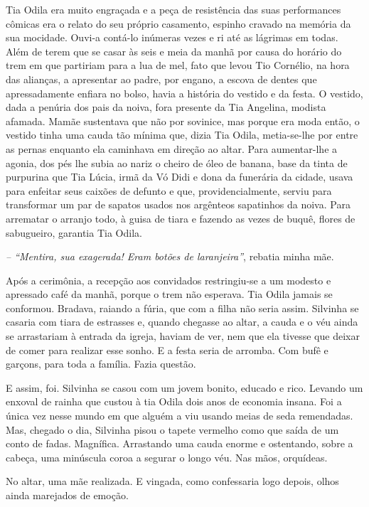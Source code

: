 Tia Odila era muito engraçada e a peça de resistência das suas performances cômicas era o relato do seu próprio casamento, espinho cravado na memória da sua mocidade.
Ouvi-a contá-lo inúmeras vezes e ri até as lágrimas em todas.
Além de terem que se casar às seis e meia da manhã por causa do horário do trem em que partiriam para a lua de mel, fato que levou Tio Cornélio, na hora das alianças, a apresentar ao padre, por engano, a escova de dentes que apressadamente enfiara no bolso, havia a história do vestido e da festa.
O vestido, dada a penúria dos pais da noiva, fora presente da Tia Angelina, modista afamada.
Mamãe sustentava que não por sovinice, mas porque era moda então, o vestido tinha uma cauda tão mínima que, dizia Tia Odila, metia-se-lhe por entre as pernas enquanto ela caminhava em direção ao altar.
Para aumentar-lhe a agonia, dos pés lhe subia ao nariz o cheiro de óleo de banana, base da tinta de purpurina que Tia Lúcia, irmã da Vó Didi e dona da funerária da cidade, usava para enfeitar seus caixões de defunto e que, providencialmente, serviu para transformar um par de sapatos usados nos argênteos sapatinhos da noiva.
Para arrematar o arranjo todo, à guisa de tiara e fazendo as vezes de buquê, flores de sabugueiro, garantia Tia Odila.

{\itshape -- ``Mentira, sua exagerada! Eram botões de laranjeira''}, rebatia minha mãe.

Após a cerimônia, a recepção aos convidados restringiu-se a um modesto e apressado café da manhã, porque o trem não esperava.
Tia Odila jamais se conformou.
Bradava, raiando a fúria, que com a filha não seria assim.
Silvinha se casaria com tiara de estrasses e, quando chegasse ao altar, a cauda e o véu ainda se arrastariam à entrada da igreja, haviam de ver, nem que ela tivesse que deixar de comer para realizar esse sonho.
E a festa seria de arromba.
Com bufê e garçons, para toda a família.
Fazia questão.

E assim, foi.
Silvinha se casou com um jovem bonito, educado e rico.
Levando um enxoval de rainha que custou à tia Odila dois anos de economia insana.
Foi a única vez nesse mundo em que alguém a viu usando meias de seda remendadas.
Mas, chegado o dia, Silvinha pisou o tapete vermelho como que saída de um conto de fadas.
Magnífica.
Arrastando uma cauda enorme e ostentando, sobre a cabeça, uma minúscula coroa a segurar o longo véu.
Nas mãos, orquídeas.


No altar, uma mãe realizada.
E vingada, como confessaria logo depois, olhos ainda marejados de emoção.

